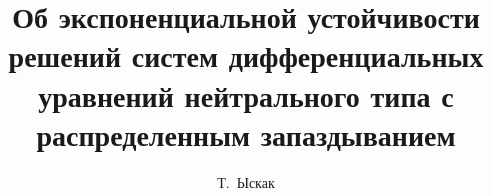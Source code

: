 

\usepackage{todonotes} %

\usepackage[russian]{nla}

%
%


%




%
\fi

\title{Об экспоненциальной устойчивости решений систем дифференциальных уравнений нейтрального типа с распределенным запаздыванием}
\author{Т.~Ыскак   %
} %


